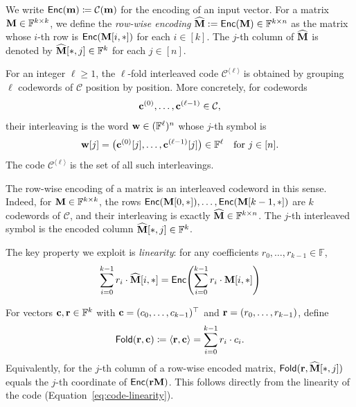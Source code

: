 We write $\mathsf{Enc}(\mathbf{m}) \coloneqq \mathcal{C}(\mathbf{m})$ for the encoding of an input vector.
For a matrix $\mathbf{M} \in \mathbb{F}^{k \times k}$, we define the
\emph{row-wise encoding} $\widehat{\mathbf{M}} := \mathsf{Enc}(\mathbf{M}) \in \mathbb{F}^{k \times n}$ as the matrix whose $i$-th row is $\mathsf{Enc}(\mathbf{M}[i,*])$ for each $i \in [k]$.
The $j$-th column of $\widehat{\mathbf{M}}$ is denoted by
$\widehat{\mathbf{M}}[*,j] \in \mathbb{F}^k$ for each $j \in [n]$.

\begin{definition}\label{def:interleaved-code}
For an integer \(\ell\ge 1\), the \(\ell\)-fold interleaved code
\(\mathcal{C}^{\langle \ell\rangle}\) is obtained by grouping \(\ell\)
codewords of \(\mathcal{C}\) position by position.  More concretely, for
codewords
\[
  \mathbf{c}^{(0)},\ldots,\mathbf{c}^{(\ell-1)}\in\mathcal{C},
\]
their interleaving is the word
\(\mathbf{w}\in(\mathbb{F}^{\ell})^n\) whose \(j\)-th symbol is
\[
  \mathbf{w}[j]
  =
  \big(
    \mathbf{c}^{(0)}[j],
    \ldots,
    \mathbf{c}^{(\ell-1)}[j]
  \big)
  \in\mathbb{F}^{\ell}
  \quad\text{for }j\in[n].
\]
The code \(\mathcal{C}^{\langle \ell\rangle}\) is the set of all such
interleavings.

The row-wise encoding of a matrix is an interleaved codeword in this sense.
Indeed, for \(\mathbf{M}\in\mathbb{F}^{k\times k}\), the rows
\(\mathsf{Enc}(\mathbf{M}[0,*]),\ldots,\mathsf{Enc}(\mathbf{M}[k-1,*])\) are \(k\) codewords of
\(\mathcal{C}\), and their interleaving is exactly
\(\widehat{\mathbf{M}}\in\mathbb{F}^{k\times n}\).  The \(j\)-th interleaved
symbol is the encoded column
\(\widehat{\mathbf{M}}[*,j]\in\mathbb{F}^{k}\).
\end{definition}

The key property we exploit is \emph{linearity}: for any coefficients
$r_0, \ldots, r_{k-1} \in \mathbb{F}$,
\begin{equation}\label{eq:code-linearity}
\sum_{i=0}^{k-1} r_i \cdot \widehat{\mathbf{M}}[i,*]
=
\mathsf{Enc}\!\left(\sum_{i=0}^{k-1} r_i \cdot \mathbf{M}[i,*]\right)
\end{equation}


\begin{definition}[Fold]\label{def:fold}
For vectors $\mathbf{c},\mathbf{r}\in \mathbb{F}^k$ with
$\mathbf{c}=(c_0,\ldots,c_{k-1})^\top$ and
$\mathbf{r}=(r_0,\ldots,r_{k-1})$, define
\[
\textsf{Fold}(\mathbf{r}, \mathbf{c}) \coloneqq \langle \mathbf{r}, \mathbf{c} \rangle = \sum_{i=0}^{k-1} r_i \cdot c_i.
\]
Equivalently, for the $j$-th column of a row-wise encoded matrix,
$\textsf{Fold}(\mathbf{r}, \widehat{\mathbf{M}}[*,j])$ equals the $j$-th coordinate of
$\mathsf{Enc}(\mathbf{r}\mathbf{M})$.
This follows directly from the linearity of the code (Equation~\ref{eq:code-linearity}).
\end{definition}

